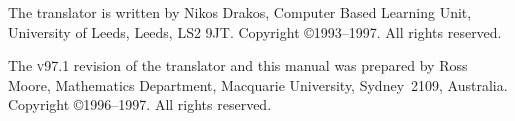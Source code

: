 \smallskip
{}\html{\\}%
The \latextohtml{} translator is written by Nikos Drakos, 
Computer Based Learning Unit,  University of Leeds,  Leeds,  LS2 9JT.
Copyright \copyright 1993--1997. All rights reserved.

\smallskip
{}\html{\\}%
The \textsc{v97.1} revision of the \latextohtml{} translator and this manual
was prepared by Ross Moore, Mathematics Department,  
Macquarie University,  Sydney~2109,  Australia.
Copyright \copyright 1996--1997. All rights reserved.







